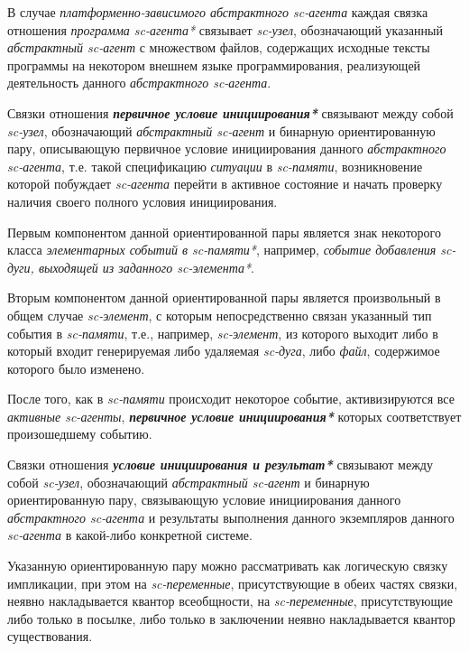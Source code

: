 В случае \textit{платформенно-зависимого абстрактного sc-агента} каждая связка отношения \textit{программа \mbox{sc-агента*}} связывает \textit{sc-узел}, обозначающий указанный \textit{абстрактный sc-агент} с множеством файлов, содержащих исходные тексты программы на некотором внешнем языке программирования, реализующей деятельность данного \textit{абстрактного sc-агента}.

Связки отношения \textbf{\textit{первичное условие инициирования*}} связывают между собой \textit{sc-узел}, обозначающий \textit{абстрактный sc-агент} и бинарную ориентированную пару, описывающую первичное условие инициирования данного \textit{абстрактного sc-агента}, т.е. такой спецификацию \textit{ситуации} в \textit{sc-памяти}, возникновение которой побуждает \textit{sc-агента} перейти в активное состояние и начать проверку наличия своего полного условия инициирования.
	
Первым компонентом данной ориентированной пары является знак некоторого класса \textit{элементарных событий в sc-памяти*}, например, \textit{событие добавления sc-дуги, выходящей из заданного sc-элемента*}.

Вторым компонентом данной ориентированной пары является произвольный в общем случае \textit{sc-элемент}, с которым непосредственно связан указанный тип события в \textit{sc-памяти}, т.е., например, \textit{sc-элемент}, из которого выходит либо в который входит генерируемая либо удаляемая \textit{sc-дуга}, либо \textit{файл}, содержимое которого было изменено.

После того, как в \textit{sc-памяти} происходит некоторое событие, активизируются все \textit{активные sc-агенты}, \textbf{\textit{первичное условие инициирования*}} которых соответствует произошедшему событию.

Связки отношения \textbf{\textit{условие инициирования и результат*}} связывают между собой \textit{sc-узел}, обозначающий \textit{абстрактный sc-агент} и бинарную ориентированную пару, связывающую условие инициирования данного \textit{абстрактного sc-агента} и результаты выполнения данного экземпляров данного \textit{sc-агента} в какой-либо конкретной системе.
	
Указанную ориентированную пару можно рассматривать как логическую связку импликации, при этом на \textit{sc-переменные}, присутствующие в обеих частях связки, неявно накладывается квантор всеобщности, на \textit{sc-переменные}, присутствующие либо только в посылке, либо только в заключении неявно накладывается квантор существования.

